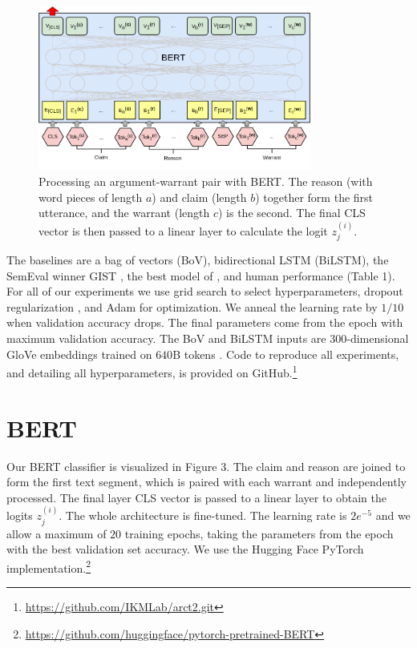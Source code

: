 \documentclass[11pt,a4paper]{article}
\begin{document}
\begin{figure}[t]
\centering
\includegraphics[width=0.8\textwidth]{BERT_ARCT.png}
\caption{Processing an argument-warrant pair with BERT. The reason (with word pieces of length $a$) and claim (length $b$) together form the first utterance, and the warrant (length $c$) is the second. The final CLS vector is then passed to a linear layer to calculate the logit $z^{(i)}_j$.}
\end{figure}

The baselines are a bag of vectors (BoV),  bidirectional LSTM \cite{HochreiterS97} (BiLSTM), the SemEval winner GIST \cite{ChoiL18}, the best model of \citeauthor{BotschenSG18} , and human performance (Table 1). For all of our experiments we use grid search to select hyperparameters, dropout regularization \cite{SrivastavaHKSS14}, and Adam \cite{KingmaB14} for optimization. We anneal the learning rate by $1/10$ when validation accuracy drops. The final parameters come from the epoch with maximum validation accuracy. The BoV and BiLSTM inputs are $300$-dimensional GloVe embeddings trained on $640$B tokens \cite{PenningtonSM14}. Code to reproduce all experiments, and detailing all hyperparameters, is provided on GitHub.\footnote{\hyperlink{https://github.com/IKMLab/arct2.git}{https://github.com/IKMLab/arct2.git}}

\section{BERT}

Our BERT classifier is visualized in Figure 3. The claim and reason are joined to form the first text segment, which is paired with each warrant and independently processed. The final layer CLS vector is passed to a linear layer to obtain the logits $z^{(i)}_j$. The whole architecture is fine-tuned.  The learning rate is $2e^{-5}$ and we allow a maximum of $20$ training epochs, taking the parameters from the epoch with the best validation set accuracy. We use the Hugging Face PyTorch implementation.\footnote{\hyperlink{https://github.com/huggingface/pytorch-pretrained-BERT}{https://github.com/huggingface/pytorch-pretrained-BERT}}
\end{document}
